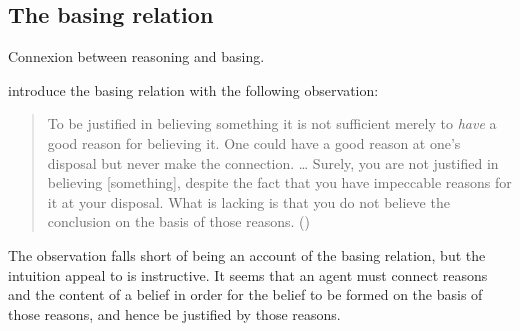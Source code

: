 \begin{note}

\end{note}

\subsection{The basing relation}

\begin{note}
  Connexion between reasoning and basing.
\end{note}

\begin{note}
  \citeauthor{Pollock:1999tm} introduce the basing relation with the following observation:
  \begin{quote}
    To be justified in believing something it is not sufficient merely to \emph{have} a good reason for believing it.
    One could have a good reason at one's disposal but never make the connection.
    \dots
    Surely, you are not justified in believing [something], despite the fact that you have impeccable reasons for it at your disposal.
    What is lacking is that you do not believe the conclusion on the basis of those reasons.\linebreak
    \mbox{}\hfill\mbox{(\citeyear[35]{Pollock:1999tm})}
  \end{quote}
  The observation falls short of being an account of the basing relation, but the intuition \citeauthor{Pollock:1999tm} appeal to is instructive.
  It seems that an agent must connect reasons and the content of a belief in order for the belief to be formed on the basis of those reasons, and hence be justified by those reasons.
\end{note}


